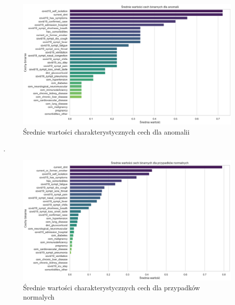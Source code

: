 \documentclass[a4paper,fleqn]{cas-dc}
\begin{document}
\begin{figure}[h]
	\includegraphics[scale=.53]{wykresy/wykres4.png}
	\caption{Średnie wartości charakterystycznych cech dla anomalii}
	\label{FIG:1}
\end{figure}
\newpage
.
\newpage
\begin{figure}[h]
	\includegraphics[scale=.53]{wykresy/wykres5.png}
	\caption{Średnie wartości charakterystycznych cech dla przypadków normalych}
	\label{FIG:1}
\end{figure}
\end{document}
